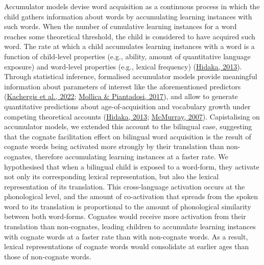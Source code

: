 \documentclass[
]{article}
\begin{document}
Accumulator models devise word acquisition as a continuous process in
which the child gathers information about words by accumulating learning
instances with such words. When the number of cumulative learning
instances for a word reaches some theoretical threshold, the child is
considered to have acquired such word. The rate at which a child
accumulates learning instances with a word is a function of child-level
properties (e.g., ability, amount of quantitative language exposure) and
word-level properties (e.g., lexical frequency)
(\protect\hyperlink{ref-hidaka2013computational}{Hidaka, 2013}). Through
statistical inference, formalised accumulator models provide meaningful
information about parameters of interest like the aforementioned
predictors (\protect\hyperlink{ref-kachergis2022standard}{Kachergis et
al., 2022}; \protect\hyperlink{ref-mollica2017how}{Mollica \&
Piantadosi, 2017}), and allow to generate quantitative predictions about
age-of-acquisition and vocabulary growth under competing theoretical
accounts (\protect\hyperlink{ref-hidaka2013computational}{Hidaka, 2013};
\protect\hyperlink{ref-mcmurray2007defusing}{McMurray, 2007}).
Capistalising on accumulator models, we extended this account to the
bilingual case, suggesting that the cognate facilitation effect on
bilingual word acquisition is the result of cognate words being
activated more strongly by their translation than non-cognates,
therefore accumulating learning instances at a faster rate. We
hypothesised that when a bilingual child is exposed to a word-form, they
activate not only its corresponding lexical representation, but also the
lexical representation of its translation. This cross-language
activation occurs at the phonological level, and the amount of
co-activation that spreads from the spoken word to its translation is
proportional to the amount of phonological similarity between both
word-forms. Cognates would receive more activation from their
translation than non-cognates, leading children to accumulate learning
instances with cognate words at a faster rate than with non-cognate
words. As a result, lexical representations of cognate words would
consolidate at earlier ages than those of non-cognate words.
\end{document}

